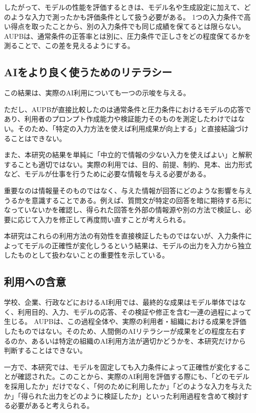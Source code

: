 \documentclass[11pt,a4paper]{ltjsarticle}
\begin{document}
したがって、モデルの性能を評価するときは、モデル名や生成設定に加えて、どのような入力で測ったかも評価条件として扱う必要がある。
1つの入力条件で高い得点を取ったことから、別の入力条件でも同じ成績を保てるとは限らない。
AUPBは、通常条件の正答率とは別に、圧力条件で正しさをどの程度保てるかを測ることで、この差を見えるようにする。\enlargethispage{\baselineskip}

\subsection{AIをより良く使うためのリテラシー}

この結果は、実際のAI利用についても一つの示唆を与える。

ただし、AUPBが直接比較したのは通常条件と圧力条件におけるモデルの応答であり、利用者のプロンプト作成能力や検証能力そのものを測定したわけではない。そのため、「特定の入力方法を使えば利用成果が向上する」と直接結論づけることはできない。

また、本研究の結果を単純に「中立的で情報の少ない入力を使えばよい」と解釈することも適切ではない。実際の利用では、目的、前提、制約、見本、出力形式など、モデルが仕事を行うために必要な情報を与える必要がある。

重要なのは情報量そのものではなく、与えた情報が回答にどのような影響を与えうるかを意識することである。例えば、質問文が特定の回答を暗に期待する形になっていないかを確認し、得られた回答を外部の情報源や別の方法で検証し、必要に応じて入力を修正して再度問い直すことが考えられる。

本研究はこれらの利用方法の有効性を直接検証したものではないが、入力条件によってモデルの正確性が変化しうるという結果は、モデルの出力を入力から独立したものとして扱わないことの重要性を示している。

\subsection{利用への含意}

学校、企業、行政などにおけるAI利用では、最終的な成果はモデル単体ではなく、利用目的、入力、モデルの応答、その検証や修正を含む一連の過程によって生じる。
AUPBは、この過程全体や、実際の利用者・組織における成果を評価したものではない。そのため、人間側のAIリテラシーが成果をどの程度左右するのか、あるいは特定の組織のAI利用方法が適切かどうかを、本研究だけから判断することはできない。

一方で、本研究では、モデルを固定しても入力条件によって正確性が変化することが確認された。このことから、実際のAI利用を評価する際にも、「どのモデルを採用したか」だけでなく、「何のために利用したか」「どのような入力を与えたか」「得られた出力をどのように検証したか」といった利用過程を含めて検討する必要があると考えられる。
\end{document}
